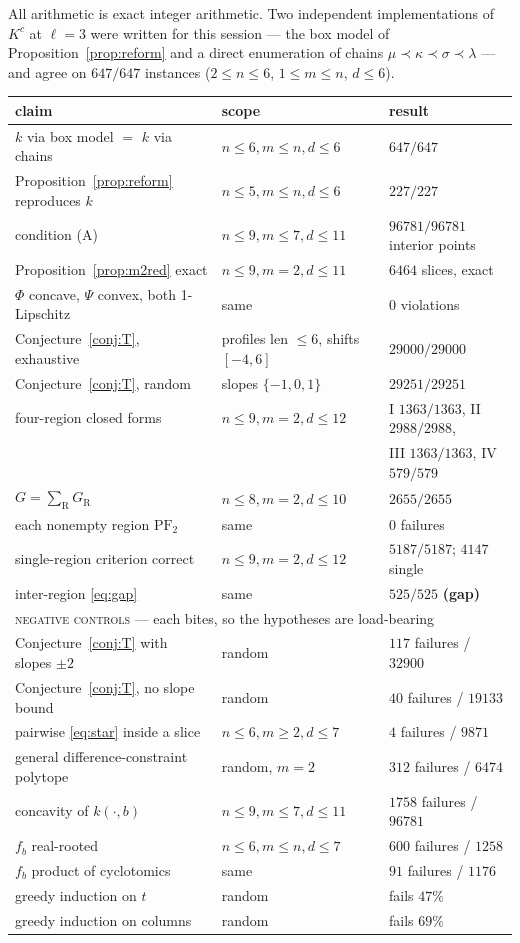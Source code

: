 \documentclass[11pt]{article}
\theoremstyle{plain}
\theoremstyle{definition}
\newcommand{\PFtwo}{\mathrm{PF}_2}
\begin{document}
All arithmetic is exact integer arithmetic. Two independent implementations of $K^c$ at
$\ell=3$ were written for this session --- the box model of Proposition~\ref{prop:reform}
and a direct enumeration of chains $\mu\prec\kappa\prec\sigma\prec\lambda$ --- and agree on
$647/647$ instances ($2\le n\le6$, $1\le m\le n$, $d\le6$).

\begin{center}
\begin{tabular}{lll}
\hline
claim & scope & result\\
\hline
$k$ via box model $=$ $k$ via chains & $n\le6,m\le n,d\le6$ & $647/647$\\
Proposition~\ref{prop:reform} reproduces $k$ & $n\le5,m\le n,d\le6$ & $227/227$\\
condition (A) & $n\le9,m\le7,d\le11$ & $96781/96781$ interior points\\
Proposition~\ref{prop:m2red} exact & $n\le9,m=2,d\le11$ & $6464$ slices, exact\\
$\Phi$ concave, $\Psi$ convex, both 1-Lipschitz & same & $0$ violations\\
Conjecture~\ref{conj:T}, exhaustive & profiles len $\le6$, shifts $[-4,6]$ & $29000/29000$\\
Conjecture~\ref{conj:T}, random & slopes $\{-1,0,1\}$ & $29251/29251$\\
four-region closed forms & $n\le9,m=2,d\le12$ & I $1363/1363$, II $2988/2988$,\\
 & & III $1363/1363$, IV $579/579$\\
$G=\sum_{\mathrm R}G_{\mathrm R}$ & $n\le8,m=2,d\le10$ & $2655/2655$\\
each nonempty region $\PFtwo$ & same & $0$ failures\\
single-region criterion correct & $n\le9,m=2,d\le12$ & $5187/5187$; $4147$ single\\
inter-region \eqref{eq:gap} & same & $525/525$ \textbf{(gap)}\\
\hline
\multicolumn{3}{l}{\textsc{negative controls} --- each bites, so the hypotheses are load-bearing}\\
\hline
Conjecture~\ref{conj:T} with slopes $\pm2$ & random & $117$ failures / $32900$\\
Conjecture~\ref{conj:T}, no slope bound & random & $40$ failures / $19133$\\
pairwise \eqref{eq:star} inside a slice & $n\le6,m\ge2,d\le7$ & $4$ failures / $9871$\\
general difference-constraint polytope & random, $m=2$ & $312$ failures / $6474$\\
concavity of $k(\cdot,b)$ & $n\le9,m\le7,d\le11$ & $1758$ failures / $96781$\\
$f_b$ real-rooted & $n\le6,m\le n,d\le7$ & $600$ failures / $1258$\\
$f_b$ product of cyclotomics & same & $91$ failures / $1176$\\
greedy induction on $t$ & random & fails $47\%$\\
greedy induction on columns & random & fails $69\%$\\
\hline
\end{tabular}
\end{center}
\end{document}
